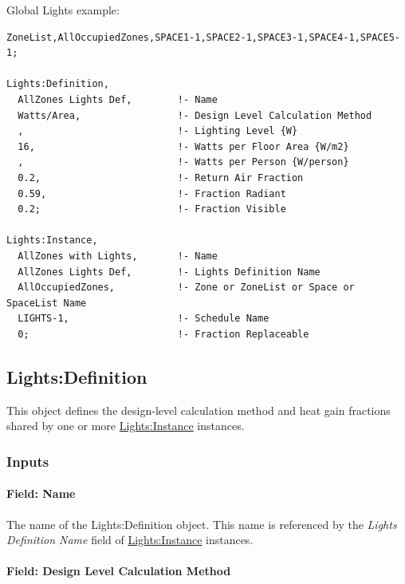 Global Lights example:

\begin{lstlisting}
ZoneList,AllOccupiedZones,SPACE1-1,SPACE2-1,SPACE3-1,SPACE4-1,SPACE5-1;

Lights:Definition,
  AllZones Lights Def,        !- Name
  Watts/Area,                 !- Design Level Calculation Method
  ,                           !- Lighting Level {W}
  16,                         !- Watts per Floor Area {W/m2}
  ,                           !- Watts per Person {W/person}
  0.2,                        !- Return Air Fraction
  0.59,                       !- Fraction Radiant
  0.2;                        !- Fraction Visible

Lights:Instance,
  AllZones with Lights,       !- Name
  AllZones Lights Def,        !- Lights Definition Name
  AllOccupiedZones,           !- Zone or ZoneList or Space or SpaceList Name
  LIGHTS-1,                   !- Schedule Name
  0;                          !- Fraction Replaceable
\end{lstlisting}

\subsection{Lights:Definition}\label{lightsdefinition}

This object defines the design-level calculation method and heat gain fractions shared by one or more \hyperref[lightsinstance]{Lights:Instance} instances.

\subsubsection{Inputs}\label{inputs-2-lightsdefinition}

\paragraph{Field: Name}\label{field-name-lightsdefinition}

The name of the Lights:Definition object. This name is referenced by the \textit{Lights Definition Name} field of \hyperref[lightsinstance]{Lights:Instance} instances.

\paragraph{Field: Design Level Calculation Method}\label{field-design-level-calculation-method-lights-definition}

